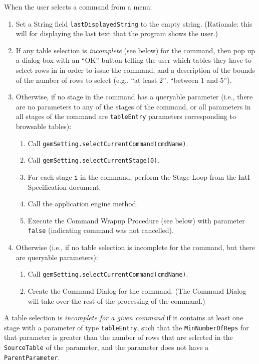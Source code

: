 \documentclass[11pt]{article}
\begin{document}
When the user selects a command from a menu:
\begin{enumerate}
\item Set a String field {\tt lastDisplayedString} to the empty string.
  (Rationale:  this will for displaying the last text that the program
  shows the user.)
\item If any table selection is {\it incomplete} (see below) for the command,
  then pop up a dialog box with an ``OK'' button telling the user
  which tables they have to select rows in in order to issue the
  command, and a description of the bounds of the number of rows to
  select (e.g., ``at least 2'', ``between 1 and 5'').
\item Otherwise, if no stage in the command has a queryable parameter
  (i.e., there are no parameters to any of the stages of the command, or all
  parameters in all stages of the command are
  {\tt tableEntry} parameters corresponding to browsable tables):
  \begin{enumerate}
  \item Call {\tt gemSetting.selectCurrentCommand(cmdName)}.
  \item Call {\tt gemSetting.selectCurrentStage(0)}.
  \item For each stage \verb/i/ in the command, perform the Stage Loop
    from the IntI Specification document.
  \item Call the application engine method.
  \item Execute the Command Wrapup Procedure (see below) with parameter
    {\tt false} (indicating command was not cancelled).
  \end{enumerate}
\item Otherwise (i.e., if no table selection is incomplete for
  the command, but there are queryable parameters):
  \begin{enumerate}
  \item Call {\tt gemSetting.selectCurrentCommand(cmdName)}.
  \item Create the Command Dialog for the command.
    (The Command Dialog will take over the rest of the processing
    of the command.)
  \end{enumerate}
\end{enumerate}
A table selection is {\it incomplete for a given command}
if it contains at least one stage with a parameter of type
{\tt tableEntry}, such that the {\tt MinNumberOfReps} for that
parameter is greater than the number of rows that are selected
in the {\tt SourceTable} of the parameter, and the parameter
does not have a {\tt ParentParameter}.
\end{document}
